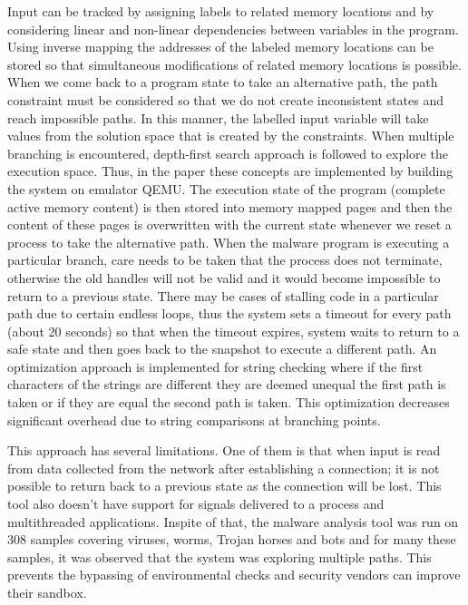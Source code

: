 \documentclass[11pt]{article}
\begin{document}
		Input can be tracked by assigning labels to related memory locations and by considering linear and non-linear dependencies between variables in the program. Using inverse mapping the addresses of the labeled memory locations can be stored so that simultaneous modifications of related memory locations is possible. When we come back to a program state to take an alternative path, the path constraint must be considered so that we do not create inconsistent states and reach impossible paths. In this manner, the labelled input variable will take values from the solution space that is created by the constraints. When multiple branching is encountered, depth-first search approach is followed to explore the execution space. Thus, in the paper these concepts are implemented by building the system on emulator QEMU. The execution state of the program (complete active memory content) is then stored into memory mapped pages and then the content of these pages is overwritten with the current state whenever we reset a process to take the alternative path. When the malware program is executing a particular branch, care needs to be taken that the process does not terminate, otherwise the old handles will not be valid and it would become impossible to return to a previous state. There may be cases of stalling code in a particular path due to certain endless loops, thus the system sets a timeout for every path (about 20 seconds) so that when the timeout expires, system waits to return to a safe state and then goes back to the snapshot to execute a different path. An optimization approach is implemented for string checking where if the first characters of the strings are different they are deemed unequal the first path is taken or if they are equal the second path is taken.  This optimization decreases significant overhead due to string comparisons at branching points.  

		This approach has several limitations. One of them is that when input is read from data collected from the network after establishing a connection; it is not possible to return back to a previous state as the connection will be lost. This tool also doesn’t have support for signals delivered to a process and multithreaded applications. Inspite of that, the malware analysis tool was run on 308 samples covering viruses, worms, Trojan horses and bots and for many these samples, it was observed that the system was exploring multiple paths. This prevents the bypassing of environmental checks and security vendors can improve their sandbox.
		
\end{document}
